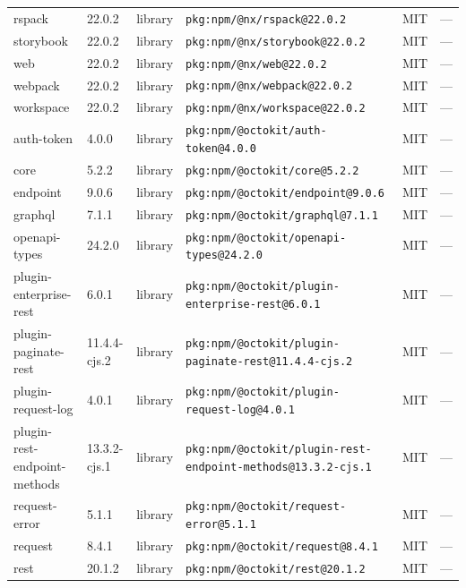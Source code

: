 \documentclass[11pt,a4paper]{article}
\begin{document}
\begin{longtable}{|p{4cm}|p{2cm}|p{1.6cm}|p{5cm}|p{1.5cm}|p{3.5cm}|}
\raggedright rspack & 22.0.2 & library & \small\texttt{pkg:npm/@nx/rspack@22.0.2} & MIT & \small — \\
\raggedright storybook & 22.0.2 & library & \small\texttt{pkg:npm/@nx/storybook@22.0.2} & MIT & \small — \\
\raggedright web & 22.0.2 & library & \small\texttt{pkg:npm/@nx/web@22.0.2} & MIT & \small — \\
\raggedright webpack & 22.0.2 & library & \small\texttt{pkg:npm/@nx/webpack@22.0.2} & MIT & \small — \\
\raggedright workspace & 22.0.2 & library & \small\texttt{pkg:npm/@nx/workspace@22.0.2} & MIT & \small — \\
\raggedright auth-token & 4.0.0 & library & \small\texttt{pkg:npm/@octokit/auth-token@4.0.0} & MIT & \small — \\
\raggedright core & 5.2.2 & library & \small\texttt{pkg:npm/@octokit/core@5.2.2} & MIT & \small — \\
\raggedright endpoint & 9.0.6 & library & \small\texttt{pkg:npm/@octokit/endpoint@9.0.6} & MIT & \small — \\
\raggedright graphql & 7.1.1 & library & \small\texttt{pkg:npm/@octokit/graphql@7.1.1} & MIT & \small — \\
\raggedright openapi-types & 24.2.0 & library & \small\texttt{pkg:npm/@octokit/openapi-types@24.2.0} & MIT & \small — \\
\raggedright plugin-enterprise-rest & 6.0.1 & library & \small\texttt{pkg:npm/@octokit/plugin-enterprise-rest@6.0.1} & MIT & \small — \\
\raggedright plugin-paginate-rest & 11.4.4-cjs.2 & library & \small\texttt{pkg:npm/@octokit/plugin-paginate-rest@11.4.4-cjs.2} & MIT & \small — \\
\raggedright plugin-request-log & 4.0.1 & library & \small\texttt{pkg:npm/@octokit/plugin-request-log@4.0.1} & MIT & \small — \\
\raggedright plugin-rest-endpoint-methods & 13.3.2-cjs.1 & library & \small\texttt{pkg:npm/@octokit/plugin-rest-endpoint-methods@13.3.2-cjs.1} & MIT & \small — \\
\raggedright request-error & 5.1.1 & library & \small\texttt{pkg:npm/@octokit/request-error@5.1.1} & MIT & \small — \\
\raggedright request & 8.4.1 & library & \small\texttt{pkg:npm/@octokit/request@8.4.1} & MIT & \small — \\
\raggedright rest & 20.1.2 & library & \small\texttt{pkg:npm/@octokit/rest@20.1.2} & MIT & \small — \\

\end{longtable}
\end{document}
